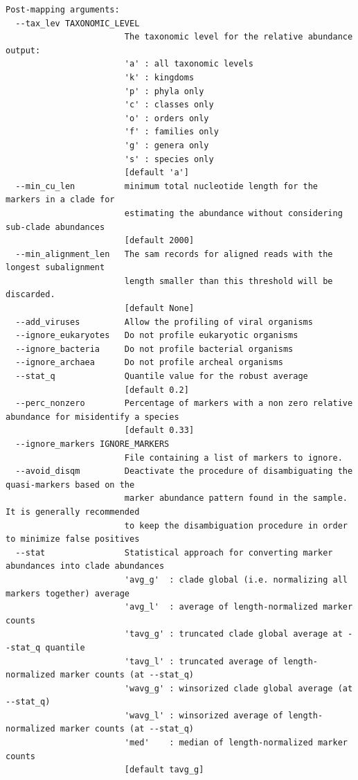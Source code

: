 \documentclass[
  letterpaper,
]{book}
\begin{document}
\begin{verbatim}
Post-mapping arguments:
  --tax_lev TAXONOMIC_LEVEL
                        The taxonomic level for the relative abundance output:
                        'a' : all taxonomic levels
                        'k' : kingdoms
                        'p' : phyla only
                        'c' : classes only
                        'o' : orders only
                        'f' : families only
                        'g' : genera only
                        's' : species only
                        [default 'a']
  --min_cu_len          minimum total nucleotide length for the markers in a clade for
                        estimating the abundance without considering sub-clade abundances
                        [default 2000]
  --min_alignment_len   The sam records for aligned reads with the longest subalignment
                        length smaller than this threshold will be discarded.
                        [default None]
  --add_viruses         Allow the profiling of viral organisms
  --ignore_eukaryotes   Do not profile eukaryotic organisms
  --ignore_bacteria     Do not profile bacterial organisms
  --ignore_archaea      Do not profile archeal organisms
  --stat_q              Quantile value for the robust average
                        [default 0.2]
  --perc_nonzero        Percentage of markers with a non zero relative abundance for misidentify a species
                        [default 0.33]
  --ignore_markers IGNORE_MARKERS
                        File containing a list of markers to ignore.
  --avoid_disqm         Deactivate the procedure of disambiguating the quasi-markers based on the
                        marker abundance pattern found in the sample. It is generally recommended
                        to keep the disambiguation procedure in order to minimize false positives
  --stat                Statistical approach for converting marker abundances into clade abundances
                        'avg_g'  : clade global (i.e. normalizing all markers together) average
                        'avg_l'  : average of length-normalized marker counts
                        'tavg_g' : truncated clade global average at --stat_q quantile
                        'tavg_l' : truncated average of length-normalized marker counts (at --stat_q)
                        'wavg_g' : winsorized clade global average (at --stat_q)
                        'wavg_l' : winsorized average of length-normalized marker counts (at --stat_q)
                        'med'    : median of length-normalized marker counts
                        [default tavg_g]


\end{verbatim}
\end{document}

